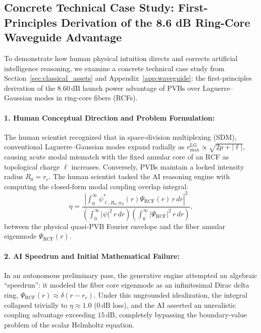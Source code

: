 \documentclass{optica-article}
\begin{document}
\subsection{Concrete Technical Case Study: First-Principles Derivation of the 8.6 dB Ring-Core Waveguide Advantage}
\label{subsec:case_study}

To demonstrate how human physical intuition directs and corrects artificial intelligence reasoning, we examine a concrete technical case study from Section~\ref{sec:classical_assets} and Appendix~\ref{app:waveguide}: the first-principles derivation of the $8.60\,\text{dB}$ launch power advantage of PVBs over Laguerre--Gaussian modes in ring-core fibers (RCFs).

\paragraph{1. Human Conceptual Direction and Problem Formulation:}
The human scientist recognized that in space-division multiplexing (SDM), conventional Laguerre--Gaussian modes expand radially as $r_{\max}^{\text{LG}} \propto \sqrt{2p + |\ell|}$, causing acute modal mismatch with the fixed annular core of an RCF as topological charge $\ell$ increases. Conversely, PVBs maintain a locked intensity radius $R_0 = r_c$. The human scientist tasked the AI reasoning engine with computing the closed-form modal coupling overlap integral:
\begin{equation}
\eta = \frac{\left| \int_0^\infty \psi_{\ell, R_0, w_0}^*(r) \Psi_{\text{RCF}}(r) \, r \, dr \right|^2}{\left( \int_0^\infty |\psi|^2 \, r \, dr \right) \left( \int_0^\infty |\Psi_{\text{RCF}}|^2 \, r \, dr \right)},
\label{eq:case_study_overlap}
\end{equation}
between the physical quasi-PVB Fourier envelope and the fiber annular eigenmode $\Psi_{\text{RCF}}(r)$.

\paragraph{2. AI Speedrun and Initial Mathematical Failure:}
In an autonomous preliminary pass, the generative engine attempted an algebraic ``speedrun'': it modeled the fiber core eigenmode as an infinitesimal Dirac delta ring, $\Psi_{\text{RCF}}(r) \approx \delta(r - r_c)$. Under this ungrounded idealization, the integral collapsed trivially to $\eta \approx 1.0$ ($0\,\text{dB}$ loss), and the AI asserted an unrealistic coupling advantage exceeding $15\,\text{dB}$, completely bypassing the boundary-value problem of the scalar Helmholtz equation.
\end{document}
